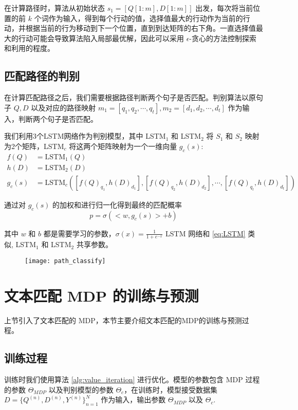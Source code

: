 在计算路径时，算法从初始状态 $s_1 = [Q[1:m], D[1:m]]$ 出发，每次将当前位置的前 $k$ 个词作为输入，得到每个行动的值，选择值最大的行动作为当前的行动，并根据当前的行为移动到下一个位置，直到到达矩阵的右下角。一直选择值最大的行动可能会导致算法陷入局部最优解，因此可以采用 $\epsilon$-贪心的方法控制探索和利用的程度。

\subsection{匹配路径的判别}
\label{sec:path_classify}

在计算匹配路径之后，我们需要根据路径判断两个句子是否匹配。判别算法以原句子 $Q, D$ 以及对应的路径映射 $m_1 = [q_1, q_2, \cdots, q_t], m_2 = [d_1, d_2, \cdots, d_t]$ 作为输入，判断两个句子是否匹配。

我们利用3个LSTM网络作为判别模型，其中 LSTM$_1$ 和 LSTM$_2$ 将 $S_1$ 和 $S_2$ 映射为2个矩阵，LSTM$_c$ 将这两个矩阵映射为一个一维向量 $g_c(s)$:
$$
\begin{aligned}
f(Q) &= \text{LSTM}_1(Q) \\
h(D) &= \text{LSTM}_2(D) \\
g_c(s) &= \text{LSTM}_c([{f(Q)}_{q_1}, {h(D)}_{d_1}], [{f(Q)}_{q_2}, {h(D)}_{d_2}], \cdots, [{f(Q)}_{q_t}, {h(D)}_{d_t}])
\end{aligned}
$$

通过对 $g_c(s)$ 的加权和进行归一化得到最终的匹配概率
\begin{equation}
\label{eq:TM_classfiy}
p = \sigma(<w, g_c(s)> + b)
\end{equation}

其中 $w$ 和 $b$ 都是需要学习的参数，$\sigma(x) = \frac{1}{1+e^{-x}}$
LSTM 网络和 \ref{eq:LSTM} 类似, LSTM$_1$  和 LSTM$_2$ 共享参数。

\begin{figure}[!htbp]
    \centering
    \texttt{[image: path\_classify]}
    \label{fig:path_classify}
\end{figure}

\section{文本匹配 MDP 的训练与预测}
上节引入了文本匹配的 MDP，本节主要介绍文本匹配的MDP的训练与预测过程。
\subsection{训练过程}
训练时我们使用算法 \ref{alg:value_iteration} 进行优化。模型的参数包含 MDP 过程的参数 $\Theta_{MDP}$ 以及判别模型的参数 $\Theta_{c}$，在训练时，模型接受数据集 $D=\{Q^{(n)}, D^{(n)}, Y^{(n)}\}_{n=1}^N$ 作为输入，输出参数 $\Theta_{MDP}$ 以及 $\Theta_{c}$.

